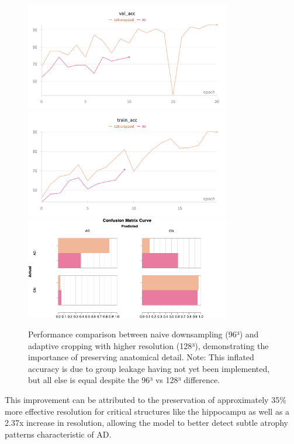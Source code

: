 \documentclass[12pt, a4paper]{article}
\begin{document}
\begin{figure}[htbp]
  \centering
  \includegraphics[width=0.8\textwidth]{figures/crop_val_acc.png}
  \includegraphics[width=0.8\textwidth]{figures/crop_train_acc.png}
  \includegraphics[width=0.8\textwidth]{figures/crop_CM.png}
  \caption{Performance comparison between naive downsampling (96³) and adaptive cropping with higher resolution (128³), demonstrating the importance of preserving anatomical detail. Note: This inflated accuracy is due to group leakage having not yet been implemented, but all else is equal despite the 96³ vs 128³ difference.}
  \label{fig:cropping_impact}
\end{figure}

This improvement can be attributed to the preservation of approximately 35\% more effective resolution for critical structures like the hippocampu as well as a 2.37x increase in resolution, allowing the model to better detect subtle atrophy patterns characteristic of AD.
\end{document}
